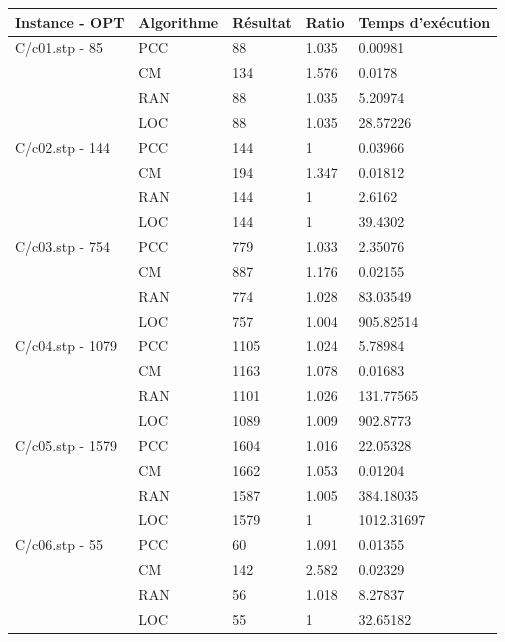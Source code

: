 \documentclass[12pt,a4paper]{article}
\begin{document}
\begin{center}
	\begin{tabular}{l|l|l|l|l}
		Instance - OPT & Algorithme & Résultat & Ratio & Temps d'exécution\\ \hline \hline
		C/c01.stp - 85&PCC&88&1.035&0.00981\\
		&CM&134&1.576&0.0178\\
		&RAN&88&1.035&5.20974\\
		&LOC&88&1.035&28.57226\\\hline
		C/c02.stp - 144&PCC&144&1&0.03966\\
		&CM&194&1.347&0.01812\\
		&RAN&144&1&2.6162\\
		&LOC&144&1&39.4302\\\hline
		C/c03.stp - 754&PCC&779&1.033&2.35076\\
		&CM&887&1.176&0.02155\\
		&RAN&774&1.028&83.03549\\
		&LOC&757&1.004&905.82514\\\hline
		C/c04.stp - 1079&PCC&1105&1.024&5.78984\\
		&CM&1163&1.078&0.01683\\
		&RAN&1101&1.026&131.77565\\
		&LOC&1089&1.009&902.8773\\\hline
		C/c05.stp - 1579&PCC&1604&1.016&22.05328\\
		&CM&1662&1.053&0.01204\\
		&RAN&1587&1.005&384.18035\\
		&LOC&1579&1&1012.31697\\\hline
		C/c06.stp - 55&PCC&60&1.091&0.01355\\
		&CM&142&2.582&0.02329\\
		&RAN&56&1.018&8.27837\\
		&LOC&55&1&32.65182\\\hline
	\end{tabular}
\end{center}
\end{document}

